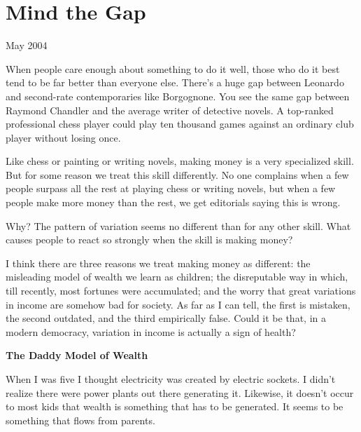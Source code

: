 \chapter{Mind the Gap}


            
              
                

May 2004

When people care enough about something
                  to do it well, those who do it best tend to be far better than
                  everyone else. There's a huge gap between Leonardo and
                  second-rate contemporaries like Borgognone. You see the same
                  gap between Raymond Chandler and the average writer of
                  detective novels. A top-ranked professional chess player could
                  play ten thousand games against an ordinary club player
                  without losing once.

Like chess or painting or
                  writing novels, making money is a very specialized skill. But
                  for some reason we treat this skill differently. No one
                  complains when a few people surpass all the rest at playing
                  chess or writing novels, but when a few people make more money
                  than the rest, we get editorials saying this is wrong.

Why?
                  The pattern of variation seems no different than for any other
                  skill. What causes people to react so strongly when the skill
                  is making money?

I think there are three reasons we
                  treat making money as different: the misleading model of
                  wealth we learn as children; the disreputable way in which,
                  till recently, most fortunes were accumulated; and the worry
                  that great variations in income are somehow bad for society.
                  As far as I can tell, the first is mistaken, the second
                  outdated, and the third empirically false. Could it be that,
                  in a modern democracy, variation in income is actually a sign
                  of health?

\textbf{The Daddy Model of Wealth}

When I was five I thought electricity was created
                  by electric sockets. I didn't realize there were power plants
                  out there generating it. Likewise, it doesn't occur to most
                  kids that wealth is something that has to be generated. It
                  seems to be something that flows from parents.


